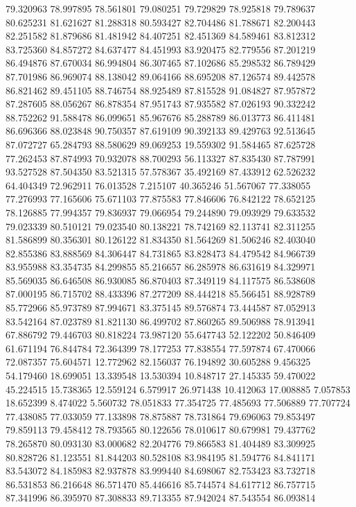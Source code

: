 79.320963
78.997895
78.561801
79.080251
79.729829
78.925818
79.789637
80.625231
81.621627
81.288318
80.593427
82.704486
81.788671
82.200443
82.251582
81.879686
81.481942
84.407251
82.451369
84.589461
83.812312
83.725360
84.857272
84.637477
84.451993
83.920475
82.779556
87.201219
86.494876
87.670034
86.994804
86.307465
87.102686
85.298532
86.789429
87.701986
86.969074
88.138042
89.064166
88.695208
87.126574
89.442578
86.821462
89.451105
88.746754
88.925489
87.815528
91.084827
87.957872
87.287605
88.056267
86.878354
87.951743
87.935582
87.026193
90.332242
88.752262
91.588478
86.099651
85.967676
85.288789
86.013773
86.411481
86.696366
88.023848
90.750357
87.619109
90.392133
89.429763
92.513645
87.072727
65.284793
88.580629
89.069253
19.559302
91.584465
87.625728
77.262453
87.874993
70.932078
88.700293
56.113327
87.835430
87.787991
93.527528
87.504350
83.521315
57.578367
35.492169
87.433912
62.526232
64.404349
72.962911
76.013528
7.215107
40.365246
51.567067
77.338055
77.276993
77.165606
75.671103
77.875583
77.846606
76.842122
78.652125
78.126885
77.994357
79.836937
79.066954
79.244890
79.093929
79.633532
79.023339
80.510121
79.023540
80.138221
78.742169
82.113741
82.311255
81.586899
80.356301
80.126122
81.834350
81.564269
81.506246
82.403040
82.855386
83.888569
84.306447
84.731865
83.828473
84.479542
84.966739
83.955988
83.354735
84.299855
85.216657
86.285978
86.631619
84.329971
85.569035
86.646508
86.930085
86.870403
87.349119
84.117575
86.538608
87.000195
86.715702
88.433396
87.277209
88.444218
85.566451
88.928789
85.772966
85.973789
87.994671
83.375145
89.576874
73.444587
87.052913
83.542164
87.023789
81.821130
86.499702
87.860265
89.506988
78.913941
67.886792
79.446703
80.818224
73.987120
55.647743
52.122202
50.846409
61.671194
76.844784
72.364399
78.177253
77.838554
77.597874
67.470066
72.087357
75.604571
12.772962
82.156037
76.194892
30.605288
9.456325
54.179460
18.699051
13.339548
13.530394
10.848717
27.145335
59.470022
45.224515
15.738365
12.559124
6.579917
26.971438
10.412063
17.008885
7.057853
18.652399
8.474022
5.560732
78.051833
77.354725
77.485693
77.506889
77.707724
77.438085
77.033059
77.133898
78.875887
78.731864
79.696063
79.853497
79.859113
79.458412
78.793565
80.122656
78.010617
80.679981
79.437762
78.265870
80.093130
83.000682
82.204776
79.866583
81.404489
83.309925
80.828726
81.123551
81.844203
80.528108
83.984195
81.594776
84.841171
83.543072
84.185983
82.937878
83.999440
84.698067
82.753423
83.732718
86.531853
86.216648
86.571470
85.446616
85.744574
84.617712
86.757715
87.341996
86.395970
87.308833
89.713355
87.942024
87.543554
86.093814
